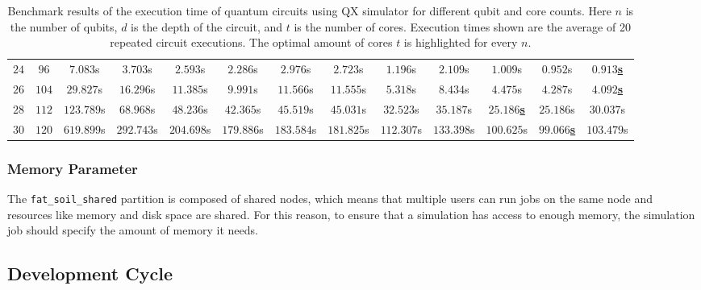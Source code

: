 \begin{table}[ht]
\begin{adjustwidth}{-1.2cm}{-1.2cm}
{\begin{tabular}{ccccccccccccc}
            $24$ & $96$ & $7.083$s & $3.703$s & $2.593$s & $2.286$s & $2.976$s & $2.723$s & $1.196$s & $2.109$s & $1.009$s & $0.952$s & \underline{$\mathbf{0.913}$\textbf{s}} \\
            $26$ & $104$ & $29.827$s & $16.296$s & $11.385$s & $9.991$s & $11.566$s & $11.555$s & $5.318$s & $8.434$s & $4.475$s & $4.287$s & \underline{$\mathbf{4.092}$\textbf{s}} \\
            $28$ & $112$ & $123.789$s & $68.968$s & $48.236$s & $42.365$s & $45.519$s & $45.031$s & $32.523$s & $35.187$s & \underline{$\mathbf{25.186}$\textbf{s}} & $25.186$s & $30.037$s \\
            $30$ & $120$ & $619.899$s & $292.743$s & $204.698$s & $179.886$s & $183.584$s & $181.825$s & $112.307$s & $133.398$s & $100.625$s & \underline{$\mathbf{99.066}$\textbf{s}} & $103.479$s \\
            
        \end{tabular}
    }
    \end{adjustwidth}
    \caption[Benchmark results of the execution time of quantum circuits using QX simulator for different qubit and core counts.]{
        Benchmark results of the execution time of quantum circuits using QX simulator for different qubit and core counts.
        Here $n$ is the number of qubits, $d$ is the depth of the circuit, and $t$ is the number of cores.
        Execution times shown are the average of 20 repeated circuit executions.
        The optimal amount of cores $t$ is highlighted for every $n$.
    }
    \label{table:qx_benchmark}
\end{table}

\subsubsection{Memory Parameter}
The \texttt{fat_soil_shared} partition is composed of shared nodes, which means that multiple users can run jobs on the same node and resources like memory and disk space are shared.
For this reason, to ensure that a simulation has access to enough memory, the simulation job should specify the amount of memory it needs.

\subsection{Development Cycle}


